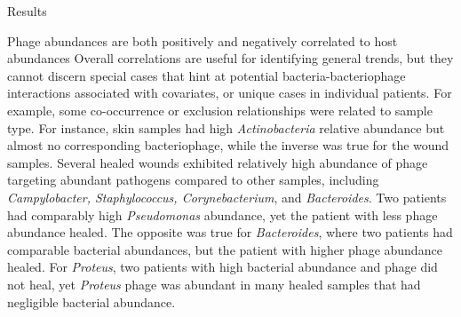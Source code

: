 \documentclass[oneside,12pt,final]{sty/ucthesis-CA2012}
\begin{document}
\begin{mainmatter}
\begin{section}{Results}
\begin{subsection}{Phage abundances are both positively and negatively correlated to host abundances}
Overall correlations are useful for identifying general trends, but they cannot discern special cases that hint at potential bacteria-bacteriophage interactions associated with covariates, or unique cases in individual patients. For example, some co-occurrence or exclusion relationships were related to sample type. For instance, skin samples had high \textit{Actinobacteria} relative abundance but almost no corresponding bacteriophage, while the inverse was true for the wound samples. Several healed wounds exhibited relatively high abundance of phage targeting abundant pathogens compared to other samples, including \textit{Campylobacter, Staphylococcus, Corynebacterium}, and \textit{Bacteroides}. Two patients had comparably high \textit{Pseudomonas} abundance, yet the patient with less phage abundance healed. The opposite was true for \textit{Bacteroides}, where two patients had comparable bacterial abundances, but the patient with higher phage abundance healed. For \textit{Proteus}, two patients with high bacterial abundance and phage did not heal, yet \textit{Proteus} phage was abundant in many healed samples that had negligible bacterial abundance.




\end{subsection}
\end{section}
\end{mainmatter}
\end{document}
